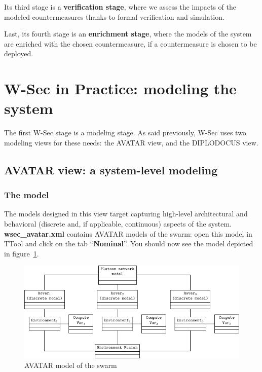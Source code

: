 \documentclass{article}
\begin{document}
Its third stage is a \textbf{verification stage}, where we assess the impacts of the modeled countermeasures thanks to formal verification and simulation.

Last, its fourth stage is an \textbf{enrichment stage}, where the models of the system are enriched with the chosen countermeasure, if a countermeasure is chosen to be deployed.


\section{W-Sec in Practice: modeling the system}

The first W-Sec stage is a modeling stage. As said previously, W-Sec uses two modeling views for these needs: the AVATAR view, and the DIPLODOCUS view.

\subsection{AVATAR view: a system-level modeling}

\subsubsection{The model}

The models designed in this view target capturing high-level architectural and behavioral (discrete and, if applicable, continuous) aspects of the system. \textbf{wsec\_avatar.xml} contains AVATAR models of the swarm: open this model in TTool and click on the tab ``\textbf{Nominal}''. You should now see the model depicted in figure~\ref{fig:avatarmodel}.

\begin{figure}
	\centering
	\includegraphics{figures/avatarmodel.pdf}
	\caption{AVATAR model of the swarm}
	\label{fig:avatarmodel}
\end{figure}
\end{document}
